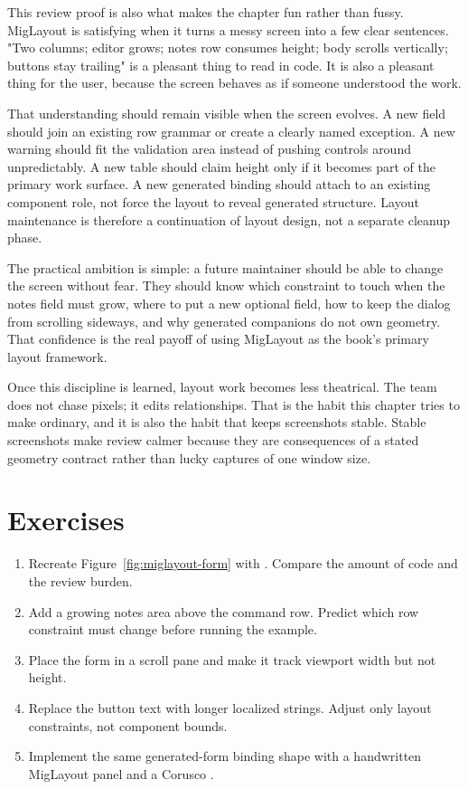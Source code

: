 This review proof is also what makes the chapter fun rather than fussy.
MigLayout is satisfying when it turns a messy screen into a few clear
sentences. "Two columns; editor grows; notes row consumes height; body scrolls
vertically; buttons stay trailing" is a pleasant thing to read in code. It is
also a pleasant thing for the user, because the screen behaves as if someone
understood the work.

That understanding should remain visible when the screen evolves. A new field
should join an existing row grammar or create a clearly named exception. A new
warning should fit the validation area instead of pushing controls around
unpredictably. A new table should claim height only if it becomes part of the
primary work surface. A new generated binding should attach to an existing
component role, not force the layout to reveal generated structure. Layout
maintenance is therefore a continuation of layout design, not a separate
cleanup phase.

The practical ambition is simple: a future maintainer should be able to change
the screen without fear. They should know which constraint to touch when the
notes field must grow, where to put a new optional field, how to keep the dialog
from scrolling sideways, and why generated companions do not own geometry. That
confidence is the real payoff of using MigLayout as the book's primary layout
framework.

Once this discipline is learned, layout work becomes less theatrical. The team
does not chase pixels; it edits relationships. That is the habit this chapter
tries to make ordinary, and it is also the habit that keeps screenshots stable.
Stable screenshots make review calmer because they are consequences of a stated
geometry contract rather than lucky captures of one window size.

\section{Exercises}

\begin{exercisebox}
\begin{enumerate}
\item Recreate Figure~\ref{fig:miglayout-form} with . Compare the amount of code and the review burden.
\item Add a growing notes area above the command row. Predict which row constraint must change before running the example.
\item Place the form in a scroll pane and make it track viewport width but not height.
\item Replace the button text with longer localized strings. Adjust only layout constraints, not component bounds.
\item Implement the same generated-form binding shape with a handwritten MigLayout panel and a Corusco .
\end{enumerate}
\end{exercisebox}

